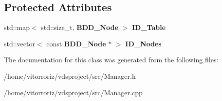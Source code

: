\subsection*{Protected Attributes}
\begin{DoxyCompactItemize}
\item 
std\+::map$<$ std\+::size\+\_\+t, {\bf B\+D\+D\+\_\+\+Node} $>$ {\bfseries I\+D\+\_\+\+Table}\label{classClassProject_1_1Manager_a19a5b01b92811f6e218265a223ae4168}

\item 
std\+::vector$<$ const {\bf B\+D\+D\+\_\+\+Node} $\ast$ $>$ {\bfseries I\+D\+\_\+\+Nodes}\label{classClassProject_1_1Manager_af32bdc663dfcb5d1b434dd0d7f990161}

\end{DoxyCompactItemize}


The documentation for this class was generated from the following files\+:\begin{DoxyCompactItemize}
\item 
/home/vitorroriz/vdsproject/src/Manager.\+h\item 
/home/vitorroriz/vdsproject/src/Manager.\+cpp\end{DoxyCompactItemize}
